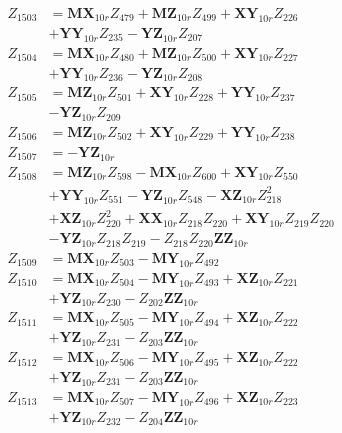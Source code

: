 \begin{multicols}{2}
\begin{align}
Z_{1503} &= \mathbf{MX}_{10r}Z_{479} + \mathbf{MZ}_{10r}Z_{499} + \mathbf{XY}_{10r}Z_{226}  \nonumber \\
&+ \mathbf{YY}_{10r}Z_{235} - \mathbf{YZ}_{10r}Z_{207} \nonumber \\
Z_{1504} &= \mathbf{MX}_{10r}Z_{480} + \mathbf{MZ}_{10r}Z_{500} + \mathbf{XY}_{10r}Z_{227}  \nonumber \\
&+ \mathbf{YY}_{10r}Z_{236} - \mathbf{YZ}_{10r}Z_{208} \nonumber \\
Z_{1505} &= \mathbf{MZ}_{10r}Z_{501} + \mathbf{XY}_{10r}Z_{228} + \mathbf{YY}_{10r}Z_{237}  \nonumber \\
&- \mathbf{YZ}_{10r}Z_{209} \nonumber \\
Z_{1506} &= \mathbf{MZ}_{10r}Z_{502} + \mathbf{XY}_{10r}Z_{229} + \mathbf{YY}_{10r}Z_{238} \nonumber \\
Z_{1507} &= -\mathbf{YZ}_{10r} \nonumber \\
Z_{1508} &= \mathbf{MZ}_{10r}Z_{598} - \mathbf{MX}_{10r}Z_{600} + \mathbf{XY}_{10r}Z_{550}  \nonumber \\
&+ \mathbf{YY}_{10r}Z_{551} - \mathbf{YZ}_{10r}Z_{548} - \mathbf{XZ}_{10r}Z_{218}^2  \nonumber \\
&+ \mathbf{XZ}_{10r}Z_{220}^2 + \mathbf{XX}_{10r}Z_{218}Z_{220} + \mathbf{XY}_{10r}Z_{219}Z_{220}  \nonumber \\
&- \mathbf{YZ}_{10r}Z_{218}Z_{219} - Z_{218}Z_{220}\mathbf{ZZ}_{10r} \nonumber \\
Z_{1509} &= \mathbf{MX}_{10r}Z_{503} - \mathbf{MY}_{10r}Z_{492} \nonumber \\
Z_{1510} &= \mathbf{MX}_{10r}Z_{504} - \mathbf{MY}_{10r}Z_{493} + \mathbf{XZ}_{10r}Z_{221}  \nonumber \\
&+ \mathbf{YZ}_{10r}Z_{230} - Z_{202}\mathbf{ZZ}_{10r} \nonumber \\
Z_{1511} &= \mathbf{MX}_{10r}Z_{505} - \mathbf{MY}_{10r}Z_{494} + \mathbf{XZ}_{10r}Z_{222}  \nonumber \\
&+ \mathbf{YZ}_{10r}Z_{231} - Z_{203}\mathbf{ZZ}_{10r} \nonumber \\
Z_{1512} &= \mathbf{MX}_{10r}Z_{506} - \mathbf{MY}_{10r}Z_{495} + \mathbf{XZ}_{10r}Z_{222}  \nonumber \\
&+ \mathbf{YZ}_{10r}Z_{231} - Z_{203}\mathbf{ZZ}_{10r} \nonumber \\
Z_{1513} &= \mathbf{MX}_{10r}Z_{507} - \mathbf{MY}_{10r}Z_{496} + \mathbf{XZ}_{10r}Z_{223}  \nonumber \\
&+ \mathbf{YZ}_{10r}Z_{232} - Z_{204}\mathbf{ZZ}_{10r} \nonumber \\

\end{align}
\end{multicols}
